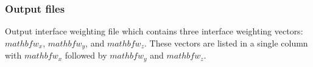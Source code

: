 \subsubsection{Output files}

\begin{description}[leftmargin=5cm, style=sameline, align=left]
\item[\fileName{output face weight}] Output interface weighting file which contains three interface weighting vectors: $mathbf{w}_x$, $mathbf{w}_y$, and $mathbf{w}_z$. These vectors are listed in a single column with $mathbf{w}_x$ followed by $mathbf{w}_y$ and $mathbf{w}_z$. 
\end{description}